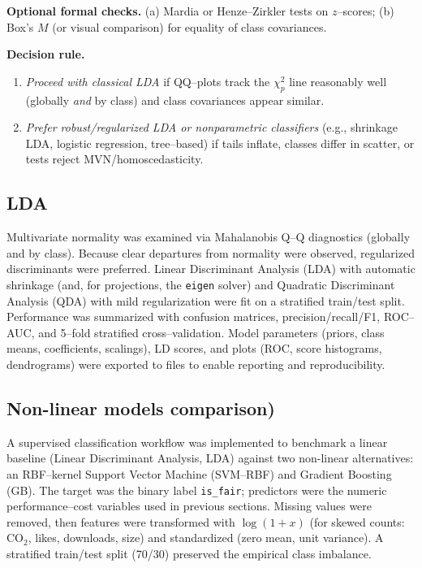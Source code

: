 \documentclass[journal]{IEEEtran}
\begin{document}
\textbf{Optional formal checks.} (a) Mardia or Henze–Zirkler tests on $z$–scores; (b) Box’s $M$
(or visual comparison) for equality of class covariances.

\textbf{Decision rule.}
\begin{enumerate}[nosep,leftmargin=*]
	\item \emph{Proceed with classical LDA} if QQ–plots track the $\chi^2_p$ line reasonably well
	(globally \emph{and} by class) and class covariances appear similar.
	\item \emph{Prefer robust/regularized LDA or nonparametric classifiers}
	(e.g., shrinkage LDA, logistic regression, tree–based) if tails inflate, classes differ in
	scatter, or tests reject MVN/homoscedasticity.
\end{enumerate}

\subsection{LDA }

Multivariate normality was examined via Mahalanobis Q–Q diagnostics (globally and by class). Because clear departures from normality were observed, regularized discriminants were preferred. Linear Discriminant Analysis (LDA) with automatic shrinkage (and, for projections, the \texttt{eigen} solver) and Quadratic Discriminant Analysis (QDA) with mild regularization were fit on a stratified train/test split. Performance was summarized with confusion matrices, precision/recall/F1, ROC–AUC, and 5–fold stratified cross–validation. Model parameters (priors, class means, coefficients, scalings), LD scores, and plots (ROC, score histograms, dendrograms) were exported to files to enable reporting and reproducibility.

\subsection{Non-linear models comparison)}
A supervised classification workflow was implemented to benchmark a linear baseline
(Linear Discriminant Analysis, LDA) against two non-linear alternatives:
an RBF–kernel Support Vector Machine (SVM–RBF) and Gradient Boosting (GB).
The target was the binary label \texttt{is\_fair}; predictors were the numeric
performance–cost variables used in previous sections. Missing values were removed,
then features were transformed with $\log(1+x)$ (for skewed counts: CO$_2$, likes,
downloads, size) and standardized (zero mean, unit variance). A stratified
train/test split (70/30) preserved the empirical class imbalance. 
\end{document}
